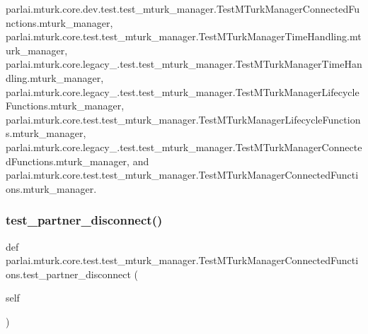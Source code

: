 parlai.\+mturk.\+core.\+dev.\+test.\+test\+\_\+mturk\+\_\+manager.\+Test\+M\+Turk\+Manager\+Connected\+Functions.\+mturk\+\_\+manager, parlai.\+mturk.\+core.\+test.\+test\+\_\+mturk\+\_\+manager.\+Test\+M\+Turk\+Manager\+Time\+Handling.\+mturk\+\_\+manager, parlai.\+mturk.\+core.\+legacy\+\_.\+test.\+test\+\_\+mturk\+\_\+manager.\+Test\+M\+Turk\+Manager\+Time\+Handling.\+mturk\+\_\+manager, parlai.\+mturk.\+core.\+legacy\+\_.\+test.\+test\+\_\+mturk\+\_\+manager.\+Test\+M\+Turk\+Manager\+Lifecycle\+Functions.\+mturk\+\_\+manager, parlai.\+mturk.\+core.\+test.\+test\+\_\+mturk\+\_\+manager.\+Test\+M\+Turk\+Manager\+Lifecycle\+Functions.\+mturk\+\_\+manager, parlai.\+mturk.\+core.\+legacy\+\_.\+test.\+test\+\_\+mturk\+\_\+manager.\+Test\+M\+Turk\+Manager\+Connected\+Functions.\+mturk\+\_\+manager, and parlai.\+mturk.\+core.\+test.\+test\+\_\+mturk\+\_\+manager.\+Test\+M\+Turk\+Manager\+Connected\+Functions.\+mturk\+\_\+manager.

\mbox{\label{classparlai_1_1mturk_1_1core_1_1test_1_1test__mturk__manager_1_1TestMTurkManagerConnectedFunctions_a278857870f1d9af0b31c45955d10b466}} 
\subsubsection{\texorpdfstring{test\+\_\+partner\+\_\+disconnect()}{test\_partner\_disconnect()}}
{\footnotesize\ttfamily def parlai.\+mturk.\+core.\+test.\+test\+\_\+mturk\+\_\+manager.\+Test\+M\+Turk\+Manager\+Connected\+Functions.\+test\+\_\+partner\+\_\+disconnect (\begin{DoxyParamCaption}\item[{}]{self }\end{DoxyParamCaption})}




